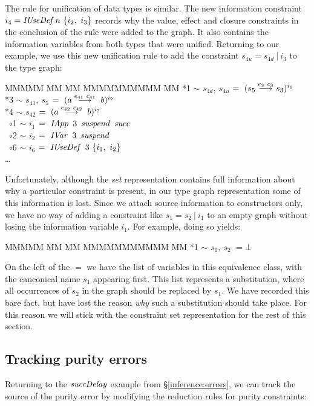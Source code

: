 The rule for unification of data types is similar. The new information constraint $i_4 = \operatorname{\mathit{IUseDef}} n \ \{ i_2, \ i_3 \}$ records why the value, effect and closure constraints in the conclusion of the rule were added to the graph. It also contains the information variables from both types that were unified. Returning to our example, we use this new unification rule to add the constraint $s_{4u} = s_{4d} \ | \ i_3$ to the type graph:
\begin{tabbing}
MMMMM	\= MM 	\= MM 		\= MMMMMMMMMM 		\= MM \kill
	\> *1	\> $\sim$	\> $s_{4d}, \ s_{4u}$
				\> $= \ (s_5 \stackrel{e_3 \ c_3}{\longrightarrow} s_3)^{i_6}$
	\\
	\> *3	\> $\sim$	\> $s_{41}, \ s_{5}$		
				\> $= \ (a \lfuna{e_{41} \ c_{41}} \ b)^{i_2}$ 
	\\
	\> *4	\> $\sim$	\> $s_{42}$
				\> $= \ (a \lfuna{e_{42} \ c_{42}} \ b)^{i_2}$ 
	\\
	\> \ $\circ$1 \> $\sim$	\> $i_1$ 	
				\> $= \ \iIApp \ 3 \ \isuspend \ \isucc$ \\
	\> \ $\circ$2 \> $\sim$ \> $i_2$	
				\> $= \ \operatorname{\mathit{IVar}} \ 3 \ \operatorname{\mathit{suspend}}$ \\
	\> \ $\circ$6 \> $\sim$	\> $i_6$ 	
				\> $= \ \operatorname{\mathit{IUseDef}} \ 3 \ \{ i_1, \ i_2 \} $ \\

	\> \qq \dots 
\end{tabbing}
Unfortunately, although the \emph{set} representation contains full information about why a particular constraint is present, in our type graph representation some of this information is lost. Since we attach source information to constructors only, we have no way of adding a constraint like $s_1 = s_2 \ | \ i_1$ to an empty graph without losing the information variable $i_1$. For example, doing so yields:
\begin{tabbing}
MMMMM	\= MM	\= MM		\= MMMMMMMMMMM 		\= MM \kill
	\> *1	\> $\sim$	\> $s_1, \ s_2$ 	\> $= \bot$  
\end{tabbing}
On the left of the $=$ we have the list of variables in this equivalence class, with the canconical name $s_1$ appearing first. This list represents a substitution, where all occurrences of $s_2$ in the graph should be replaced by $s_1$. We have recorded this bare fact, but have lost the reason \emph{why} such a substitution should take place. For this reason we will stick with the constraint set representation for the rest of this section.

\clearpage{}
\subsection{Tracking purity errors}
Returning to the $\operatorname{\mathit{succDelay}}$ example from \S\ref{inference:errors}, we can track the source of the purity error by modifying the reduction rules for purity constraints:

